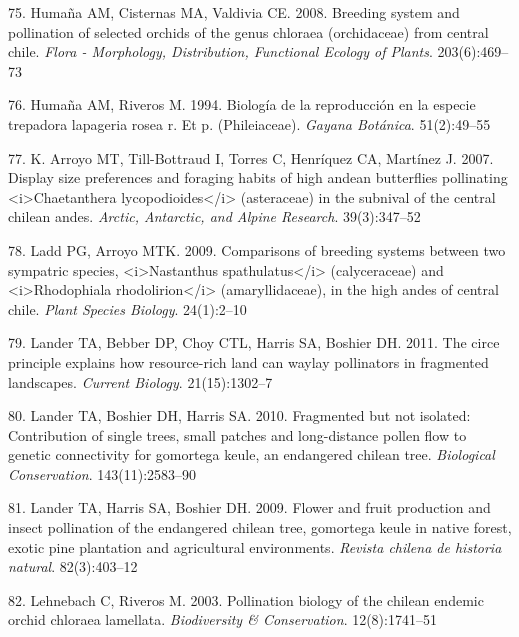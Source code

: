 \documentclass[
]{article}
\begin{document}
\leavevmode\hypertarget{ref-RN126}{}%
75. Humaña AM, Cisternas MA, Valdivia CE. 2008. Breeding system and
pollination of selected orchids of the genus chloraea (orchidaceae) from
central chile. \emph{Flora - Morphology, Distribution, Functional
Ecology of Plants}. 203(6):469--73

\leavevmode\hypertarget{ref-RN87}{}%
76. Humaña AM, Riveros M. 1994. Biología de la reproducción en la
especie trepadora lapageria rosea r. Et p. (Phileiaceae). \emph{Gayana
Botánica}. 51(2):49--55

\leavevmode\hypertarget{ref-RN104}{}%
77. K. Arroyo MT, Till-Bottraud I, Torres C, Henríquez CA, Martínez J.
2007. Display size preferences and foraging habits of high andean
butterflies pollinating \textless i\textgreater Chaetanthera
lycopodioides\textless/i\textgreater{} (asteraceae) in the subnival of
the central chilean andes. \emph{Arctic, Antarctic, and Alpine
Research}. 39(3):347--52

\leavevmode\hypertarget{ref-RN127}{}%
78. Ladd PG, Arroyo MTK. 2009. Comparisons of breeding systems between
two sympatric species, \textless i\textgreater Nastanthus
spathulatus\textless/i\textgreater{} (calyceraceae) and
\textless i\textgreater Rhodophiala rhodolirion\textless/i\textgreater{}
(amaryllidaceae), in the high andes of central chile. \emph{Plant
Species Biology}. 24(1):2--10

\leavevmode\hypertarget{ref-RN130}{}%
79. Lander TA, Bebber DP, Choy CTL, Harris SA, Boshier DH. 2011. The
circe principle explains how resource-rich land can waylay pollinators
in fragmented landscapes. \emph{Current Biology}. 21(15):1302--7

\leavevmode\hypertarget{ref-RN129}{}%
80. Lander TA, Boshier DH, Harris SA. 2010. Fragmented but not isolated:
Contribution of single trees, small patches and long-distance pollen
flow to genetic connectivity for gomortega keule, an endangered chilean
tree. \emph{Biological Conservation}. 143(11):2583--90

\leavevmode\hypertarget{ref-RN128}{}%
81. Lander TA, Harris SA, Boshier DH. 2009. Flower and fruit production
and insect pollination of the endangered chilean tree, gomortega keule
in native forest, exotic pine plantation and agricultural environments.
\emph{Revista chilena de historia natural}. 82(3):403--12

\leavevmode\hypertarget{ref-RN2}{}%
82. Lehnebach C, Riveros M. 2003. Pollination biology of the chilean
endemic orchid chloraea lamellata. \emph{Biodiversity \& Conservation}.
12(8):1741--51
\end{document}
